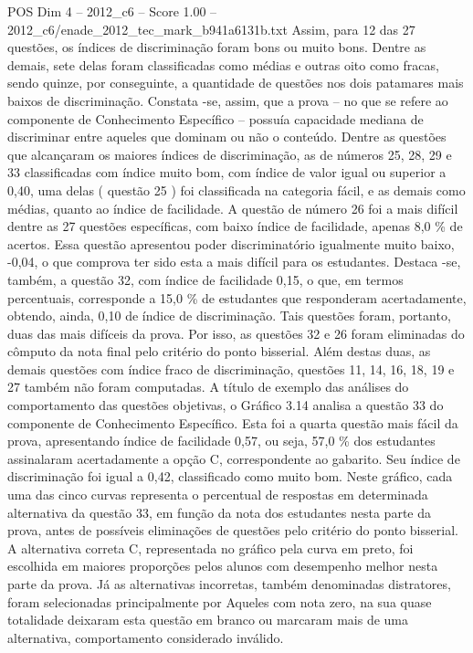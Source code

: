 \begin{textsample}{POS Dim 4 – 2012\_c6 – Score 1.00 – 2012\_c6/enade\_2012\_tec\_mark\_b941a6131b.txt}
Assim, para 12 das 27 questões, os índices de discriminação foram bons ou muito bons.
Dentre as demais, sete delas foram classificadas como médias e outras oito como fracas, sendo quinze, por conseguinte, a quantidade de questões nos dois patamares mais baixos de discriminação.
Constata -se, assim, que a prova – no que se refere ao componente de Conhecimento Específico – possuía capacidade mediana de discriminar entre aqueles que dominam ou não o conteúdo.
Dentre as questões que alcançaram os maiores índices de discriminação, as de números 25, 28, 29 e 33 classificadas com índice muito bom, com índice de valor igual ou superior a 0,40, uma delas ( questão 25 ) foi classificada na categoria fácil, e as demais como médias, quanto ao índice de facilidade.
A questão de número 26 foi a mais difícil dentre as 27 questões específicas, com baixo índice de facilidade, apenas 8,0 \% de acertos.
Essa questão apresentou poder discriminatório igualmente muito baixo, -0,04, o que comprova ter sido esta a mais difícil para os estudantes.
Destaca -se, também, a questão 32, com índice de facilidade 0,15, o que, em termos percentuais, corresponde a 15,0 \% de estudantes que responderam acertadamente, obtendo, ainda, 0,10 de índice de discriminação.
Tais questões foram, portanto, duas das mais difíceis da prova.
Por isso, as questões 32 e 26 foram eliminadas do cômputo da nota final pelo critério do ponto bisserial.
Além destas duas, as demais questões com índice fraco de discriminação, questões 11, 14, 16, 18, 19 e 27 também não foram computadas.
A título de exemplo das análises do comportamento das questões objetivas, o Gráfico 3.14 analisa a questão 33 do componente de Conhecimento Específico.
Esta foi a quarta questão mais fácil da prova, apresentando índice de facilidade 0,57, ou seja, 57,0 \% dos estudantes assinalaram acertadamente a opção C, correspondente ao gabarito.
Seu índice de discriminação foi igual a 0,42, classificado como muito bom.
Neste gráfico, cada uma das cinco curvas representa o percentual de respostas em determinada alternativa da questão 33, em função da nota dos estudantes nesta parte da prova, antes de possíveis eliminações de questões pelo critério do ponto bisserial.
A alternativa correta C, representada no gráfico pela curva em preto, foi escolhida em maiores proporções pelos alunos com desempenho melhor nesta parte da prova.
Já as alternativas incorretas, também denominadas distratores, foram selecionadas principalmente por Aqueles com nota zero, na sua quase totalidade deixaram esta questão em branco ou marcaram mais de uma alternativa, comportamento considerado inválido.

\end{textsample}
